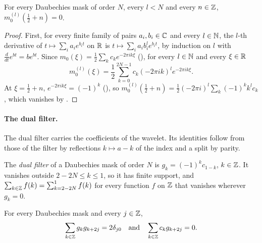 \begin{proposition}
\label{prop:daub-symbol-zeros}
\leanok
{}
For every Daubechies mask of order $N$, every $l < N$ and every $n \in \mathbb{Z}$,
$m_0^{(l)}(\frac12 + n) = 0$.
\end{proposition}

\begin{proof}
\leanok
{}
First, for every finite family of pairs $a_i, b_i \in \mathbb{C}$ and every $l \in \mathbb{N}$, the $l$-th
derivative of $t \mapsto \sum_i a_i e^{b_i t}$ on $\mathbb{R}$ is $t \mapsto \sum_i a_i b_i^l e^{b_i t}$,
by induction on $l$ with $\frac{d}{dt} e^{bt} = b e^{bt}$. Since
$m_0(\xi) = \frac12 \sum_k c_k e^{-2\pi i k \xi}$ (), for every
$l \in \mathbb{N}$ and every $\xi \in \mathbb{R}$
\[
  m_0^{(l)}(\xi) = \frac12 \sum_{k=0}^{2N-1} c_k (-2\pi i k)^l e^{-2\pi i k \xi} .
\]
At $\xi = \frac12 + n$, $e^{-2\pi i k \xi} = (-1)^k$ (), so
$m_0^{(l)}(\frac12 + n) = \frac12 (-2\pi i)^l \sum_k (-1)^k k^l c_k$, which vanishes by
.
\end{proof}

\paragraph{The dual filter.}
The dual filter carries the coefficients of the wavelet. Its identities follow from those of
the filter by reflections $k \mapsto a - k$ of the index and a split by parity.

\begin{definition}
\label{def:daub-dual-filter}
\leanok
{}
The \emph{dual filter} of a Daubechies mask of order $N$ is $g_k = (-1)^k c_{1-k}$, $k \in \mathbb{Z}$.
It vanishes outside $2 - 2N \leq k \leq 1$, so it has finite support, and
$\sum_{k \in \mathbb{Z}} f(k) = \sum_{k=2-2N}^{1} f(k)$ for every function $f$ on $\mathbb{Z}$ that vanishes
wherever $g_k = 0$.
\end{definition}

\begin{proposition}
\label{prop:daub-dual-orthogonality}
\leanok
{}
For every Daubechies mask and every $j \in \mathbb{Z}$,
\[
  \sum_{k \in \mathbb{Z}} g_k g_{k+2j} = 2 \delta_{j0} \quad\text{and}\quad
  \sum_{k \in \mathbb{Z}} c_k g_{k+2j} = 0 .
\]
\end{proposition}

